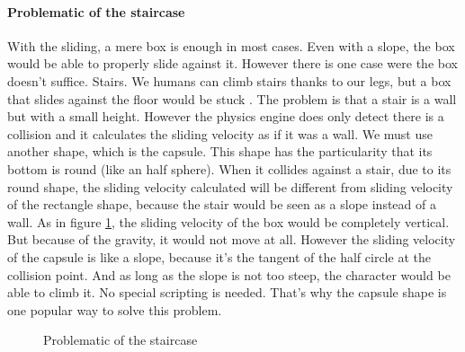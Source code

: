 \documentclass[10pt,a4paper]{article}
\begin{document}
\paragraph{Problematic of the staircase}
With the sliding, a mere box is enough in most cases. Even with a slope, the box would be able to properly slide against it. However there is one case were the box doesn't suffice. Stairs. We humans can climb stairs thanks to our legs, but a box that slides against the floor would be stuck . The problem is that a stair is a wall but with a small height. However the physics engine does only detect there is a collision and it calculates the sliding velocity as if it was a wall. We must use another shape, which is the capsule. This shape has the particularity that its bottom is round (like an half sphere). When it collides against a stair, due to its round shape, the sliding velocity calculated will be different from sliding velocity of the rectangle shape, because the stair would be seen as a slope instead of a wall. As in figure \ref{fig:stair_problematic_1}, the sliding velocity of the box would be completely vertical. But because of the gravity, it would not move at all. However the sliding velocity of the capsule is like a slope, because it's the tangent of the half circle at the collision point. And as long as the slope is not too steep, the character would be able to climb it. No special scripting is needed. That's why the capsule shape is one popular way to solve this problem.

\begin{figure}[h]
\centering
{}
\caption{Problematic of the staircase}
\label{fig:stair_problematic_1}
\end{figure}
\end{document}
